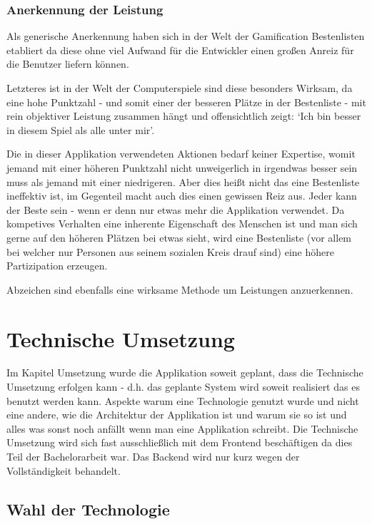 \documentclass[12pt,twoside]{book}
\begin{document}
\subsection*{Anerkennung der Leistung}

Als generische Anerkennung haben sich in der Welt der Gamification Bestenlisten etabliert da diese ohne viel Aufwand für die Entwickler einen großen Anreiz für die Benutzer liefern können.

Letzteres ist in der Welt der Computerspiele sind diese besonders Wirksam, da eine hohe Punktzahl - und somit einer der besseren Plätze in der Bestenliste - mit rein objektiver Leistung zusammen hängt und offensichtlich zeigt: `Ich bin besser in diesem Spiel als alle unter mir'.

Die in dieser Applikation verwendeten Aktionen bedarf keiner Expertise, womit jemand mit einer höheren Punktzahl nicht unweigerlich in irgendwas besser sein muss als jemand mit einer niedrigeren. Aber dies heißt nicht das eine Bestenliste ineffektiv ist, im Gegenteil macht auch dies einen gewissen Reiz aus. Jeder kann der Beste sein - wenn er denn nur etwas mehr die Applikation verwendet. Da kompetives Verhalten eine inherente Eigenschaft des Menschen ist und man sich gerne auf den höheren Plätzen bei etwas sieht, wird eine Bestenliste (vor allem bei welcher nur Personen aus seinem sozialen Kreis drauf sind) eine höhere Partizipation erzeugen.

Abzeichen sind ebenfalls eine wirksame Methode um Leistungen anzuerkennen.

\chapter{Technische Umsetzung}

Im Kapitel Umsetzung wurde die Applikation soweit geplant, dass die Technische Umsetzung erfolgen kann - d.h. das geplante System wird soweit realisiert das es benutzt werden kann. Aspekte warum eine Technologie genutzt wurde und nicht eine andere, wie die Architektur der Applikation ist und warum sie so ist und alles was sonst noch anfällt wenn man eine Applikation schreibt.
Die Technische Umsetzung wird sich fast ausschließlich mit dem Frontend beschäftigen da dies Teil der Bachelorarbeit war. Das Backend wird nur kurz wegen der Vollständigkeit behandelt.

\section*{Wahl der Technologie}
\end{document}
